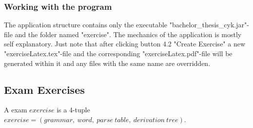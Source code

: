 \subsubsection{Working with the program}
The application structure contains only the executable "bachelor\_thesis\_\allowbreak cyk.jar"-file and the folder named "exercise". The mechanics of the application is mostly self explanatory. Just note that after clicking button 4.2 "Create Exercise" a new "exerciseLatex.tex"-file and the corresponding "exerciseLatex.pdf"-file will be generated within it and any files with the same name are overridden.

\subsection{Exam Exercises}
A exam $exercise$ is a 4-tuple $exercise = (grammar,\ word,\ parse\ table,\ derivation\ tree)$. 

